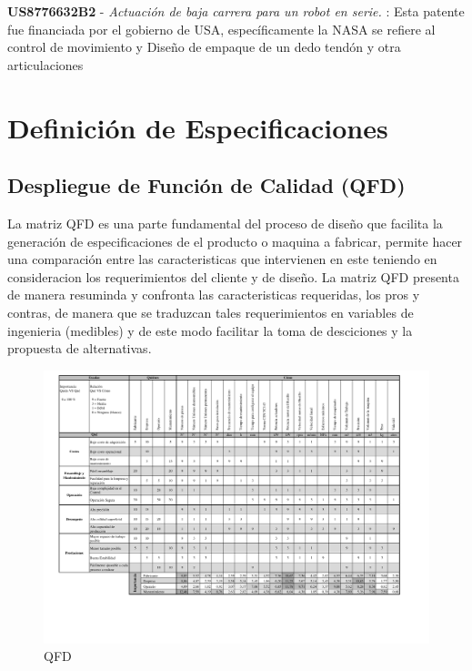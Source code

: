 \textbf{US8776632B2} - \textit{Actuación de baja carrera para un robot en serie.} \citep{patent:US8776632B2}: Esta patente fue financiada por el gobierno de USA, específicamente la NASA se refiere al control de movimiento y Diseño de empaque de un dedo tendón y otra articulaciones


\newpage

\section{Definición de Especificaciones}
\subsection{Despliegue de Función de Calidad (QFD)}

La matriz QFD es una parte fundamental del proceso de diseño que facilita la generación de especificaciones de el producto o maquina a fabricar, permite hacer una comparación entre las caracteristicas que intervienen en este teniendo en consideracion los requerimientos del cliente y de diseño. La matriz QFD presenta de manera resuminda y confronta las caracteristicas requeridas, los pros y contras, de manera que se traduzcan tales requerimientos en variables de ingenieria (medibles) y de este modo facilitar la toma de desciciones y la propuesta de alternativas.

\begin{landscape}
\begin{figure}[hb!]
    \centering
    \includegraphics[scale=0.9]{Cap2_DisenoEspecificaciones/Figura/QFD.pdf}
    \caption{QFD}
    \label{fig:QFD}
\end{figure}
\end{landscape}

